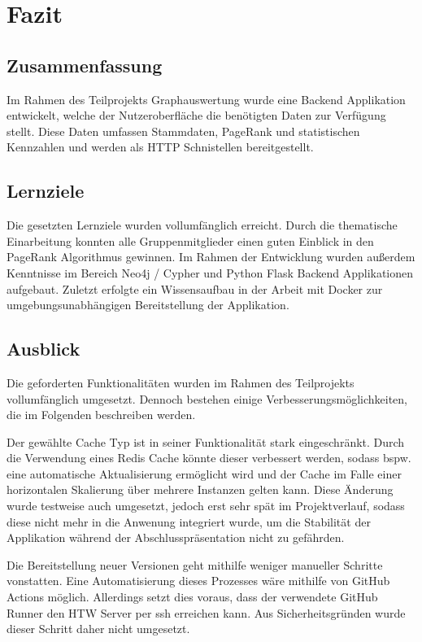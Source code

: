 \section{Fazit}

\subsection{Zusammenfassung}
Im Rahmen des Teilprojekts Graphauswertung wurde eine Backend Applikation entwickelt, welche der Nutzeroberfläche die benötigten Daten zur Verfügung stellt.
Diese Daten umfassen Stammdaten, PageRank und statistischen Kennzahlen und werden als HTTP Schnistellen bereitgestellt.

\subsection{Lernziele}
Die gesetzten Lernziele wurden vollumfänglich erreicht.
Durch die thematische Einarbeitung konnten alle Gruppenmitglieder einen guten Einblick in den PageRank Algorithmus gewinnen.
Im Rahmen der Entwicklung wurden außerdem Kenntnisse im Bereich Neo4j / Cypher und Python Flask Backend Applikationen aufgebaut.
Zuletzt erfolgte ein Wissensaufbau in der Arbeit mit Docker zur umgebungsunabhängigen Bereitstellung der Applikation.

\subsection{Ausblick}
Die geforderten Funktionalitäten wurden im Rahmen des Teilprojekts vollumfänglich umgesetzt.
Dennoch bestehen einige Verbesserungsmöglichkeiten, die im Folgenden beschreiben werden.

Der gewählte Cache Typ ist in seiner Funktionalität stark eingeschränkt.
Durch die Verwendung eines Redis Cache\cite{redis} könnte dieser verbessert werden, sodass bspw. eine automatische Aktualisierung ermöglicht wird und der Cache im Falle einer horizontalen Skalierung über mehrere Instanzen gelten kann.
Diese Änderung wurde testweise auch umgesetzt, jedoch erst sehr spät im Projektverlauf, sodass diese nicht mehr in die Anwenung integriert wurde, um die Stabilität der Applikation während der Abschlusspräsentation nicht zu gefährden.

Die Bereitstellung neuer Versionen geht mithilfe weniger manueller Schritte vonstatten.
Eine Automatisierung dieses Prozesses wäre mithilfe von GitHub Actions möglich.
Allerdings setzt dies voraus, dass der verwendete GitHub Runner den HTW Server per ssh erreichen kann.
Aus Sicherheitsgründen wurde dieser Schritt daher nicht umgesetzt.
